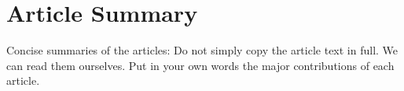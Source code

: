 \section{Article Summary}
\label{sec:articlesummary}

Concise summaries of the articles: Do not simply copy the article text in full. We can read them ourselves. Put in your own words the major contributions of each article.